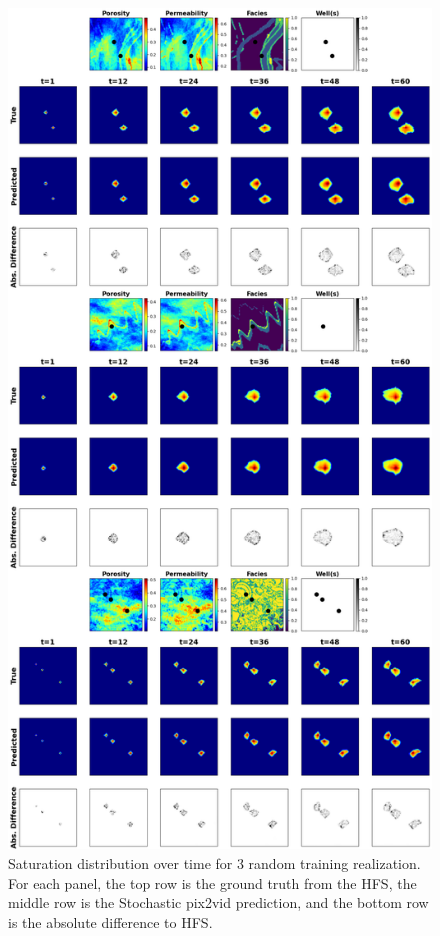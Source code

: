 \documentclass[10pt, twoside]{article}
\begin{document}
\begin{figure}
    \centering
    \includegraphics[width=\textwidth,height=0.95\textheight,keepaspectratio]{figures/train_sat.png}
    \caption{Saturation distribution over time for 3 random training realization. For each panel, the top row is the ground truth from the HFS, the middle row is the Stochastic pix2vid prediction, and the bottom row is the absolute difference to HFS.}
    \label{train_sat}
\end{figure}
\end{document}

